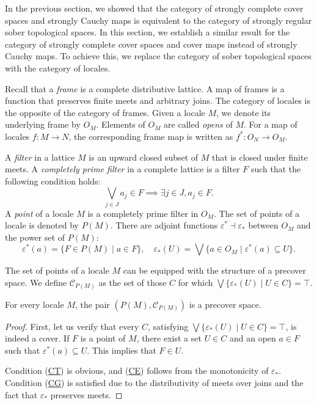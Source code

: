 \documentclass[reqno]{amsart}
\newcommand{\axref}[1]{(\hyperref[ax:#1]{#1})}
\theoremstyle{definition}
\theoremstyle{remark}
\numberwithin{figure}{section}
\begin{document}
In the previous section, we showed that the category of strongly complete cover spaces and strongly Cauchy maps is equivalent to the category of strongly regular sober topological spaces.
In this section, we establish a similar result for the category of strongly complete cover spaces and cover maps instead of strongly Cauchy maps.
To achieve this, we replace the category of sober topological spaces with the category of locales.

Recall that a \emph{frame} is a complete distributive lattice.
A map of frames is a function that preserves finite meets and arbitrary joins.
The category of locales is the opposite of the category of frames.
Given a locale $M$, we denote its underlying frame by $O_M$.  
Elements of $O_M$ are called \emph{opens} of $M$.
For a map of locales $f : M \to N$, the corresponding frame map is written as $f^* : O_N \to O_M$.

A \emph{filter} in a lattice $M$ is an upward closed subset of $M$ that is closed under finite meets.
A \emph{completely prime filter} in a complete lattice is a filter $F$ such that the following condition holds:
\[ \bigvee_{j \in J} a_j \in F \implies \exists j \in J, a_j \in F. \]
A \emph{point} of a locale $M$ is a completely prime filter in $O_M$.
The set of points of a locale is denoted by $P(M)$.
There are adjoint functions $\varepsilon^* \dashv \varepsilon_*$ between $O_M$ and the power set of $P(M)$:
\[ \varepsilon^*(a) = \{ F \in P(M) \mid a \in F \}, \quad \varepsilon_*(U) = \bigvee \{ a \in O_M \mid \varepsilon^*(a) \subseteq U \}. \]

The set of points of a locale $M$ can be equipped with the structure of a precover space.
We define $\mathcal{C}_{P(M)}$ as the set of those $C$ for which $\bigvee \{ \varepsilon_*(U) \mid U \in C \} = \top$.

\begin{prop}
For every locale $M$, the pair $(P(M),\mathcal{C}_{P(M)})$ is a precover space.
\end{prop}
\begin{proof}
First, let us verify that every $C$, satisfying $\bigvee \{ \varepsilon_*(U) \mid U \in C \} = \top$, is indeed a cover.
If $F$ is a point of $M$, there exist a set $U \in C$ and an open $a \in F$ such that $\varepsilon^*(a) \subseteq U$.
This implies that $F \in U$.

Condition \axref{CT} is obvious, and \axref{CE} follows from the monotonicity of $\varepsilon_*$.
Condition \axref{CG} is satisfied due to the distributivity of meets over joins and the fact that $\varepsilon_*$ preserves meets.
\end{proof}
\end{document}
